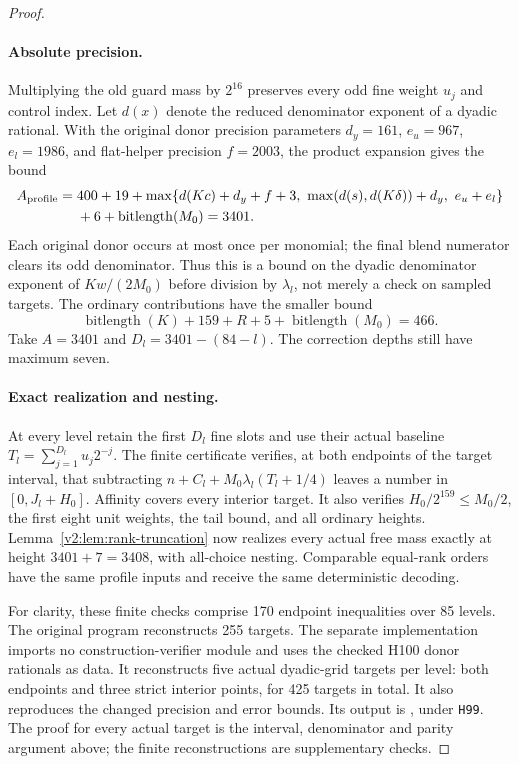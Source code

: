 \begin{proof}
\paragraph{Absolute precision.}
Multiplying the old guard mass by $2^{16}$ preserves every odd fine weight $u_j$ and control index. Let $d(x)$ denote the reduced denominator exponent of a dyadic rational. With the original donor precision parameters $d_y=161$, $e_u=967$, $e_l=1986$, and flat-helper precision $f=2003$, the product expansion gives the bound
\begin{align*}
 A_{\rm profile}={}&400+19+
 \max\{d(Kc)+d_y+f+3,\ \max(d(s),d(K\delta))+d_y,\ e_u+e_l\}\\
 &+6+\operatorname{bitlength}(M_0)=3401.
\end{align*}
Each original donor occurs at most once per monomial; the final blend numerator clears its odd denominator. Thus this is a bound on the dyadic denominator exponent of $Kw/(2M_0)$ before division by $\lambda_l$, not merely a check on sampled targets. The ordinary contributions have the smaller bound
\[
 \operatorname{bitlength}(K)+159+R+5+\operatorname{bitlength}(M_0)=466.
\]
Take $A=3401$ and $D_l=3401-(84-l)$. The correction depths still have maximum seven.

\paragraph{Exact realization and nesting.}
At every level retain the first $D_l$ fine slots and use their actual baseline
$T_l=\sum_{j=1}^{D_l}u_j2^{-j}$. The finite certificate verifies, at both endpoints of the target interval, that subtracting $n+C_l+M_0\lambda_l(T_l+1/4)$ leaves a number in $[0,J_l+H_0]$. Affinity covers every interior target. It also verifies $H_0/2^{159}\leq M_0/2$, the first eight unit weights, the tail bound, and all ordinary heights. Lemma~\ref{v2:lem:rank-truncation} now realizes every actual free mass exactly at height $3401+7=3408$, with all-choice nesting. Comparable equal-rank orders have the same profile inputs and receive the same deterministic decoding.

For clarity, these finite checks comprise 170 endpoint inequalities over 85 levels. The original program  reconstructs 255 targets. The separate implementation  imports no construction-verifier module and uses the checked H100 donor rationals as data. It reconstructs five actual dyadic-grid targets per level: both endpoints and three strict interior points, for 425 targets in total. It also reproduces the changed precision and error bounds. Its output is , under \texttt{H99}. The proof for every actual target is the interval, denominator and parity argument above; the finite reconstructions are supplementary checks.


\end{proof}
